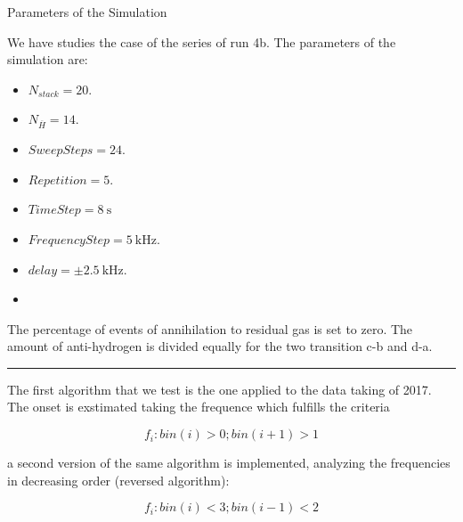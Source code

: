 \documentclass[9pt]{beamer}
\begin{document}
\begin{frame}{Parameters of the Simulation}

We have studies the case of the series of run 4b. The parameters of the simulation are:
\begin{itemize}
\item $N_{stack} = 20$.
\item $N_{\overline{H}} = 14$.
\item $SweepSteps = 24$.
\item $Repetition = 5$.
\item $TimeStep = \SI{8}{\second}$
\item $FrequencyStep = \SI{5}{\kilo \hertz}$.
\item $delay = \pm \SI{2.5}{\kilo \hertz}$.
\item {}
\end{itemize}

The percentage of events of annihilation to residual gas is set to zero. The amount of anti-hydrogen is divided equally for the two transition c-b and d-a.
\vspace{2pt}
\hrule 
\vspace{2pt}
The first algorithm that we test is the one applied to the data taking of 2017. The onset is exstimated taking the frequence which fulfills the criteria

\begin{equation}
f_{i} : bin(i) > 0; bin(i + 1) > 1
\end{equation}

a second version of the same algorithm is implemented, analyzing the frequencies in decreasing order (reversed algorithm):

\begin{equation*}
f_{i} : bin(i) < 3; bin(i - 1) < 2
\end{equation*}

\end{frame}
\end{document}
